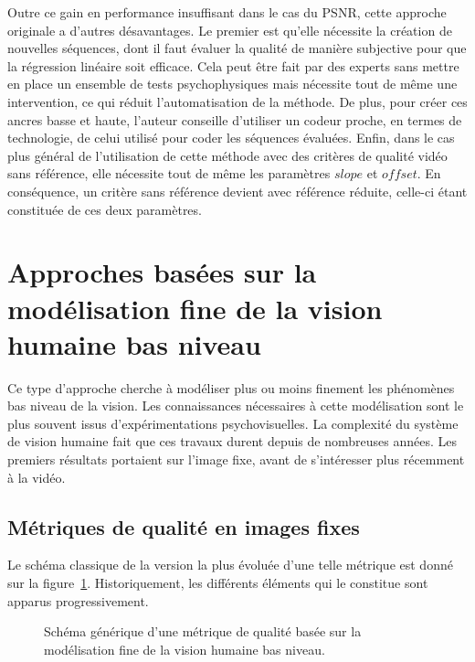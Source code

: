 Outre ce gain en performance insuffisant dans le cas du PSNR, cette approche originale a d'autres désavantages. Le premier est qu'elle nécessite la création de nouvelles séquences, dont il faut évaluer la qualité de manière subjective pour que la régression linéaire soit efficace. Cela peut être fait par des experts sans mettre en place un ensemble de tests psychophysiques mais nécessite tout de même une intervention, ce qui réduit l'automatisation de la méthode. De plus, pour créer ces ancres basse et haute, l'auteur conseille d'utiliser un codeur proche, en termes de technologie, de celui utilisé pour coder les séquences évaluées. Enfin, dans le cas plus général de l'utilisation de cette méthode avec des critères de qualité vidéo sans référence, elle nécessite tout de même les paramètres $\mathit{slope}$ et $\mathit{offset}$. En conséquence, un critère sans référence devient avec référence réduite, celle-ci étant constituée de ces deux paramètres.


\section{Approches basées sur la modélisation fine de la vision humaine bas niveau}
Ce type d'approche cherche à modéliser plus ou moins finement les phénomènes bas niveau de la vision. Les connaissances nécessaires à cette modélisation sont le plus souvent issus d'expérimentations psychovisuelles. La complexité du système de vision humaine fait que ces travaux durent depuis de nombreuses années. Les premiers résultats portaient sur l'image fixe, avant de s'intéresser plus récemment à la vidéo.


\subsection{Métriques de qualité en images fixes}
Le schéma classique de la version la plus évoluée d'une telle métrique est donné sur la figure~\ref{fig:ApprocheSVH}. Historiquement, les différents éléments qui le constitue sont apparus progressivement.

\begin{figure}[htbp]
	\centering
	\begin{tikzpicture}[text centered, node distance = 3cm]\end{tikzpicture}
	\caption{Schéma générique d'une métrique de qualité basée sur la modélisation fine de la vision humaine bas niveau.}
	\label{fig:ApprocheSVH}
\end{figure}

